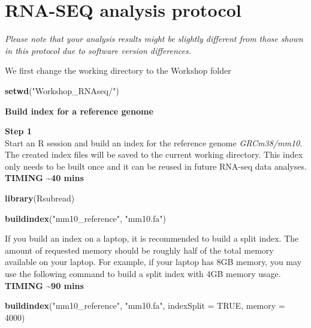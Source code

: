 \documentclass[]{book}
\newenvironment{Shaded}{\begin{snugshade}}{\end{snugshade}}
\newcommand{\DataTypeTok}[1]{\textcolor[rgb]{0.13,0.29,0.53}{#1}}
\newcommand{\DecValTok}[1]{\textcolor[rgb]{0.00,0.00,0.81}{#1}}
\newcommand{\KeywordTok}[1]{\textcolor[rgb]{0.13,0.29,0.53}{\textbf{#1}}}
\newcommand{\NormalTok}[1]{#1}
\newcommand{\OtherTok}[1]{\textcolor[rgb]{0.56,0.35,0.01}{#1}}
\newcommand{\StringTok}[1]{\textcolor[rgb]{0.31,0.60,0.02}{#1}}
\begin{document}
\hypertarget{rna-seq-analysis-protocol}{%
\chapter{RNA-SEQ analysis protocol}\label{rna-seq-analysis-protocol}}

\emph{Please note that your analysis results might be slightly different from those shown in this protocol due to software version differences.}

We first change the working directory to the Workshop folder

\begin{Shaded}
\begin{Highlighting}[]
\KeywordTok{setwd}\NormalTok{(}\StringTok{"Workshop_RNAseq/"}\NormalTok{)}
\end{Highlighting}
\end{Shaded}

\textbf{Build index for a reference genome}

\textbf{Step 1}\\
Start an R session and build an index for the reference genome \emph{GRCm38/mm10}. The created index files will be saved to the current working directory. This index only needs to be built once and it can be reused in future RNA-seq data analyses. \textbf{TIMING \textasciitilde{}40 mins}

\begin{Shaded}
\begin{Highlighting}[]
\KeywordTok{library}\NormalTok{(Rsubread)}
\end{Highlighting}
\end{Shaded}

\begin{Shaded}
\begin{Highlighting}[]
\KeywordTok{buildindex}\NormalTok{(}\StringTok{"mm10_reference"}\NormalTok{, }\StringTok{"mm10.fa"}\NormalTok{)}
\end{Highlighting}
\end{Shaded}

If you build an index on a laptop, it is recommended to build a split index. The amount of requested memory should be roughly half of the total memory available on your laptop. For example, if your laptop has 8GB memory, you may use the following command to build a split index with 4GB memory usage. \textbf{TIMING \textasciitilde{}90 mins}

\begin{Shaded}
\begin{Highlighting}[]
\KeywordTok{buildindex}\NormalTok{(}\StringTok{"mm10_reference"}\NormalTok{,}
           \StringTok{"mm10.fa"}\NormalTok{,}
           \DataTypeTok{indexSplit =} \OtherTok{TRUE}\NormalTok{,}
           \DataTypeTok{memory =} \DecValTok{4000}\NormalTok{)}
\end{Highlighting}
\end{Shaded}
\end{document}
